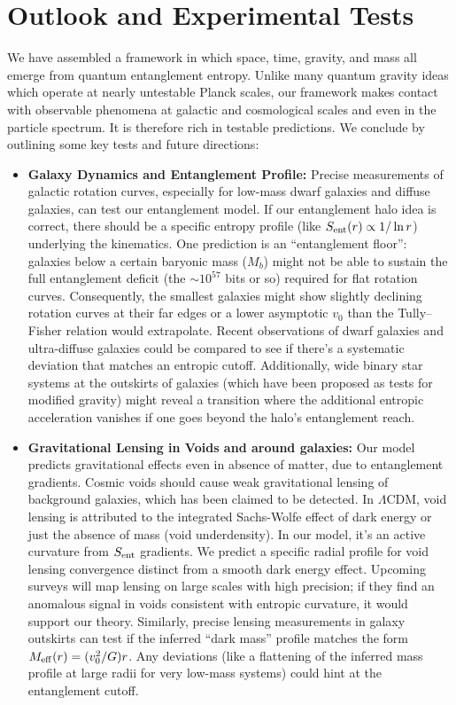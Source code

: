 \documentclass[11pt]{article}
\begin{document}
\section{Outlook and Experimental Tests}

We have assembled a framework in which space, time, gravity, and mass all emerge from quantum entanglement entropy. Unlike many quantum gravity ideas which operate at nearly untestable Planck scales, our framework makes contact with observable phenomena at galactic and cosmological scales and even in the particle spectrum. It is therefore rich in testable predictions. We conclude by outlining some key tests and future directions:

\begin{itemize}
    \item \textbf{Galaxy Dynamics and Entanglement Profile:} Precise measurements of galactic rotation curves, especially for low-mass dwarf galaxies and diffuse galaxies, can test our entanglement model. If our entanglement halo idea is correct, there should be a specific entropy profile (like $S_{\rm ent}(r) \propto 1/\ln r$) underlying the kinematics. One prediction is an “entanglement floor”: galaxies below a certain baryonic mass ($M_b$) might not be able to sustain the full entanglement deficit (the $\sim10^{57}$ bits or so) required for flat rotation curves​. Consequently, the smallest galaxies might show slightly declining rotation curves at their far edges or a lower asymptotic $v_0$ than the Tully–Fisher relation would extrapolate​. Recent observations of dwarf galaxies and ultra-diffuse galaxies could be compared to see if there’s a systematic deviation that matches an entropic cutoff. Additionally, wide binary star systems at the outskirts of galaxies (which have been proposed as tests for modified gravity) might reveal a transition where the additional entropic acceleration vanishes if one goes beyond the halo’s entanglement reach.

    \item \textbf{Gravitational Lensing in Voids and around galaxies:} Our model predicts gravitational effects even in absence of matter, due to entanglement gradients. Cosmic voids should cause weak gravitational lensing of background galaxies, which has been claimed to be detected​. In $\Lambda$CDM, void lensing is attributed to the integrated Sachs-Wolfe effect of dark energy or just the absence of mass (void underdensity). In our model, it’s an active curvature from $S_{\rm ent}$ gradients. We predict a specific radial profile for void lensing convergence distinct from a smooth dark energy effect​. Upcoming surveys will map lensing on large scales with high precision; if they find an anomalous signal in voids consistent with entropic curvature, it would support our theory. Similarly, precise lensing measurements in galaxy outskirts can test if the inferred “dark mass” profile matches the form $M_{\rm eff}(r) = (v_0^2/G)r$. Any deviations (like a flattening of the inferred mass profile at large radii for very low-mass systems) could hint at the entanglement cutoff.


\end{itemize}
\end{document}
